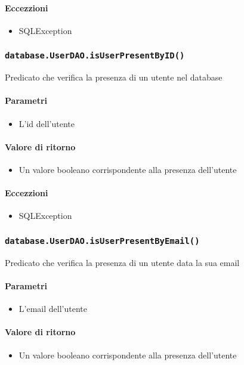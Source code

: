 \paragraph{Eccezzioni}
\begin{itemize}
  \item SQLException
\end{itemize}

\subsubsection{\texttt{database.UserDAO.isUserPresentByID()}}
Predicato che verifica la presenza di un utente nel database
\paragraph{Parametri}
\begin{itemize}
\item L'id dell'utente
\end{itemize}
\paragraph{Valore di ritorno}
\begin{itemize}
\item Un valore booleano corrispondente alla presenza dell'utente
\end{itemize}
\paragraph{Eccezzioni}
\begin{itemize}
  \item SQLException
\end{itemize}

\subsubsection{\texttt{database.UserDAO.isUserPresentByEmail()}}
Predicato che verifica la presenza di un utente data la sua email
\paragraph{Parametri}
\begin{itemize}
\item L'email dell'utente
\end{itemize}
\paragraph{Valore di ritorno}
\begin{itemize}
\item Un valore booleano corrispondente alla presenza dell'utente
\end{itemize}
